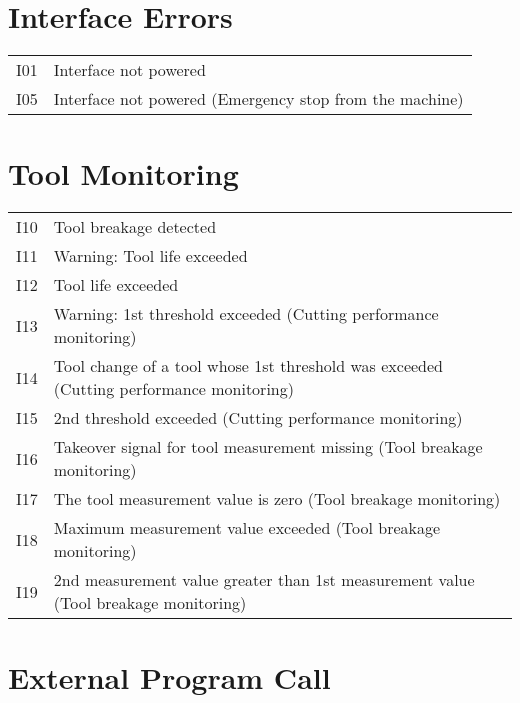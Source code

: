 \documentclass[openany,11pt]{book}
\begin{document}
\section*{Interface Errors}

\begin{table}[!h]
    \begin{tabular}{ll}
    I01 & Interface not powered \\ 
    I05 & Interface not powered (Emergency stop from the machine) \\ 
    \end{tabular}
\end{table}

\section*{Tool Monitoring}

\begin{table}[!h]
    \begin{tabular}{ll}
    I10 & Tool breakage detected \\ 
    I11 & Warning: Tool life exceeded \\ 
    I12 & Tool life exceeded \\ 
    I13 & Warning: 1st threshold exceeded (Cutting performance monitoring) \\ 
    I14 & Tool change of a tool whose 1st threshold was exceeded (Cutting performance monitoring) \\ 
    I15 & 2nd threshold exceeded (Cutting performance monitoring) \\ 
    I16 & Takeover signal for tool measurement missing (Tool breakage monitoring) \\ 
    I17 & The tool measurement value is zero (Tool breakage monitoring) \\ 
    I18 & Maximum measurement value exceeded (Tool breakage monitoring) \\ 
    I19 & 2nd measurement value greater than 1st measurement value (Tool breakage monitoring) \\ 
    \end{tabular}
\end{table}

\section*{External Program Call}
\end{document}
